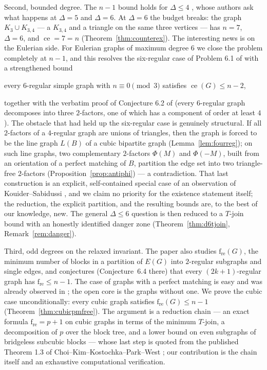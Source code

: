\documentclass[a4paper,11pt]{amsart}
\theoremstyle{definition}
\theoremstyle{remark}
\newcommand{\ce}{\operatorname{ce}}
\newcommand{\fre}{\operatorname{f_{re}}}
\begin{document}
Second, bounded degree. The $n-1$ bound holds for $\Delta\le4$ \cite{AABC25}, whose authors ask what
happens at $\Delta=5$ and $\Delta=6$. At $\Delta=6$ the budget breaks: the graph $K_3\cup K_{3,4}$ --- a
$K_{3,4}$ and a triangle on the same three vertices --- has $n=7$, $\Delta=6$, and
$\ce=7=n$ (Theorem~\ref{thm:counterex}). The interesting news is on the Eulerian side. For Eulerian graphs
of maximum degree $6$ we close the problem completely at $n-1$, and this resolves the six-regular case of
Problem 6.1 of \cite{AABC25} with a strengthened bound
\begin{center}
every $6$-regular simple graph with $n\equiv 0\pmod 3$ satisfies $\ce(G)\le n-2$,
\end{center}
together with the verbatim proof of Conjecture 6.2 of \cite{AABC25} (every $6$-regular graph decomposes
into three $2$-factors, one of which has a component of order at least $4$). The obstacle that had held up
the six-regular case is genuinely structural. If all $2$-factors of a $4$-regular graph are unions of
triangles, then the graph is forced to be the line graph $L(B)$ of a cubic bipartite graph
(Lemma~\ref{lem:fourreg}); on such line graphs, two complementary $2$-factors $\Phi(M)$ and $\Phi(-M)$,
built from an orientation of a perfect matching of $B$, partition the edge set into two triangle-free
$2$-factors (Proposition~\ref{prop:antiphi}) --- a contradiction. That last construction is an explicit,
self-contained special case of an observation of Kouider--Sabidussi \cite{KS95}, and we claim no priority
for the existence statement itself; the reduction, the explicit partition, and the resulting bounds are,
to the best of our knowledge, new. The general $\Delta\le6$ question is then reduced to a $T$-join bound
with an honestly identified danger zone (Theorem~\ref{thm:d6tjoin}, Remark~\ref{rem:danger}).

Third, odd degrees on the relaxed invariant. The paper \cite{AABC25} also studies $\fre(G)$, the minimum
number of blocks in a partition of $E(G)$ into $2$-regular subgraphs and single edges, and conjectures
(Conjecture~6.4 there) that every $(2k+1)$-regular graph has $\fre\le n-1$. The case of graphs with a
perfect matching is easy and was already observed in \cite{AABC25}; the open core is the graphs without
one. We prove the cubic case unconditionally: every cubic graph satisfies $\fre(G)\le n-1$
(Theorem~\ref{thm:cubicpmfree}). The argument is a reduction chain --- an exact formula
$\fre=p+1$ on cubic graphs in terms of the minimum $T$-join, a decomposition of $p$ over the block tree,
and a lower bound on even subgraphs of bridgeless subcubic blocks --- whose last step is quoted from the
published Theorem 1.3 of Choi--Kim--Kostochka--Park--West \cite{CKKPW19}; our contribution is the chain
itself and an exhaustive computational verification.
\end{document}
